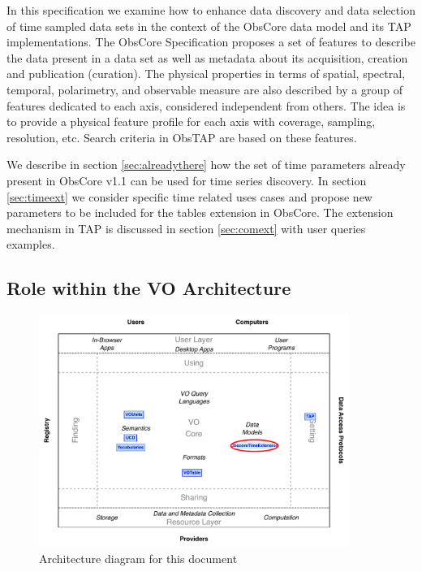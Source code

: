 \documentclass[11pt,a4paper]{ivoa}
\begin{document}
In this specification we examine how to enhance data discovery and data selection of time sampled data sets in the context of the ObsCore data model and its TAP implementations.
The ObsCore Specification \citep{2017ivoa.spec.0509L} proposes a set of features to describe the data present in a data set as well as metadata about its acquisition, creation and publication (curation).
The physical properties in terms of spatial, spectral, temporal, polarimetry, and observable measure  are also described by a group of features dedicated to each axis, considered independent from others. The idea is to provide a physical feature profile for each axis with coverage, sampling, resolution, etc.
Search criteria in ObsTAP  are based on these features.

We describe in section \ref{sec:alreadythere} how the set of time parameters already present in ObsCore v1.1 can be used for time series discovery.
In section \ref{sec:timeext} we consider specific time related uses cases and propose new parameters to be included for the tables extension in ObsCore.
The extension mechanism in TAP is discussed in section \ref{sec:comext} with user queries examples.

\subsection{Role within the VO Architecture}

\begin{figure}
\centering


\includegraphics[width=0.9\textwidth]{role_diagram.pdf}
\caption{Architecture diagram for this document}
\label{fig:archdiag}
\end{figure}
\end{document}
